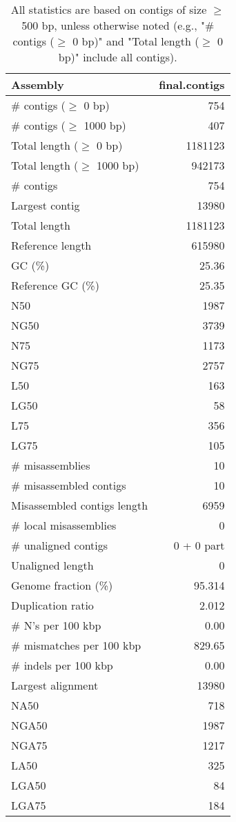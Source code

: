 \documentclass[12pt,a4paper]{article}
\begin{document}
\begin{table}[ht]
\begin{center}
\caption{All statistics are based on contigs of size $\geq$ 500 bp, unless otherwise noted (e.g., "\# contigs ($\geq$ 0 bp)" and "Total length ($\geq$ 0 bp)" include all contigs).}
\begin{tabular}{|l*{1}{|r}|}
\hline
Assembly & final.contigs \\ \hline
\# contigs ($\geq$ 0 bp) & 754 \\ \hline
\# contigs ($\geq$ 1000 bp) & 407 \\ \hline
Total length ($\geq$ 0 bp) & 1181123 \\ \hline
Total length ($\geq$ 1000 bp) & 942173 \\ \hline
\# contigs & 754 \\ \hline
Largest contig & 13980 \\ \hline
Total length & 1181123 \\ \hline
Reference length & 615980 \\ \hline
GC (\%) & 25.36 \\ \hline
Reference GC (\%) & 25.35 \\ \hline
N50 & 1987 \\ \hline
NG50 & 3739 \\ \hline
N75 & 1173 \\ \hline
NG75 & 2757 \\ \hline
L50 & 163 \\ \hline
LG50 & 58 \\ \hline
L75 & 356 \\ \hline
LG75 & 105 \\ \hline
\# misassemblies & 10 \\ \hline
\# misassembled contigs & 10 \\ \hline
Misassembled contigs length & 6959 \\ \hline
\# local misassemblies & 0 \\ \hline
\# unaligned contigs & 0 + 0 part \\ \hline
Unaligned length & 0 \\ \hline
Genome fraction (\%) & 95.314 \\ \hline
Duplication ratio & 2.012 \\ \hline
\# N's per 100 kbp & 0.00 \\ \hline
\# mismatches per 100 kbp & 829.65 \\ \hline
\# indels per 100 kbp & 0.00 \\ \hline
Largest alignment & 13980 \\ \hline
NA50 & 718 \\ \hline
NGA50 & 1987 \\ \hline
NGA75 & 1217 \\ \hline
LA50 & 325 \\ \hline
LGA50 & 84 \\ \hline
LGA75 & 184 \\ \hline
\end{tabular}
\end{center}
\end{table}
\end{document}

